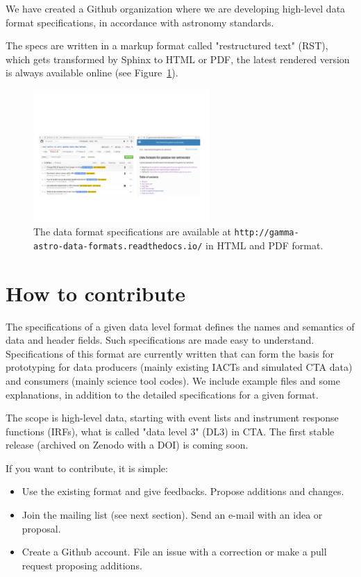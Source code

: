 We have created a Github organization where we are developing high-level data format specifications, in accordance with astronomy standards. 

The specs are written in a markup format called "restructured text" (RST),
which gets transformed by Sphinx to HTML or PDF, the latest rendered version is always available online (see Figure~\ref{fig:webpage}).

\begin{figure}[tb]
  \centerline{\includegraphics[width=0.6\textwidth]{figures/webpage}}
  \caption{The data format specifications are available at \texttt{http://gamma-astro-data-formats.readthedocs.io/} in HTML and PDF format.}
  \label{fig:webpage}
\end{figure}

\section{How to contribute}

The specifications of a given data level format defines the names and semantics of data and header fields. Such specifications are made easy to understand. Specifications of this format are currently written that can form the basis for prototyping for data producers (mainly existing IACTs and simulated CTA data) and consumers (mainly science tool codes). We include example files and some explanations, in addition to the detailed specifications for a given format. 

The scope is high-level data, starting with event lists and instrument response functions (IRFs), what is called "data level 3" (DL3) in CTA. The first stable release (archived on Zenodo with a DOI) is coming soon.

If you want to contribute, it is simple:

\begin{itemize}
\item{}Use the existing format and give feedbacks. Propose additions and changes.
\item{}Join the mailing list (see next section). Send an e-mail with an idea or proposal.
\item{}Create a Github account. File an issue with a correction or make a pull request proposing additions.
\end{itemize}

